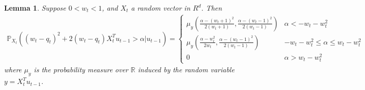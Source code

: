\documentclass[journal,onecolumn,11pt,final]{IEEEtran}
\newcommand{\1}{\mathbb{1}}
\newcommand{\R}{\mathbb{R}}
\theoremstyle{plain}
\theoremstyle{definition}
\theoremstyle{plain}
\theoremstyle{plain}
\newtheorem{lemma}[theorem]{Lemma}
\theoremstyle{definition}
\renewcommand{\P}{\mathbb{P}}
\renewcommand{\R}{\mathbb{R}}
\begin{document}
\begin{lemma}\label{lem: 1-cdf increments, pos w}
	Suppose \( 0 < w_t < 1\), and \(X_t\) a random vector in \(R^d\). Then
	\begin{align*}
		\P_{X_t}\left( (w_t - q_t)^2 + 2(w_t - q_t)X_t^T u_{t-1} > \alpha \Big| u_{t-1} \right) = \left\{
			\begin{array}{ll}
			      \mu_y\left( \frac{\alpha - (w_t + 1)^2}{2(w_t + 1)}, \frac{\alpha - (w_t - 1)^2}{2(w_t - 1)} \right) & \alpha < -w_t - w_t^2 \\
			      \mu_y\left( \frac{\alpha - w_t^2}{2w_t}, \frac{\alpha - (w_t - 1)^2}{2(w_t - 1)} \right) &  -w_t - w_t^2 \leq \alpha \leq w_t - w_t^2\\
			      0 & \alpha > w_t - w_t^2
			\end{array} 
			\right. 
	\end{align*}
	where \(\mu_y\) is the probability measure over \(\R\) induced by the random variable \(y = X_t^T u_{t-1}\).
\end{lemma}
\end{document}
